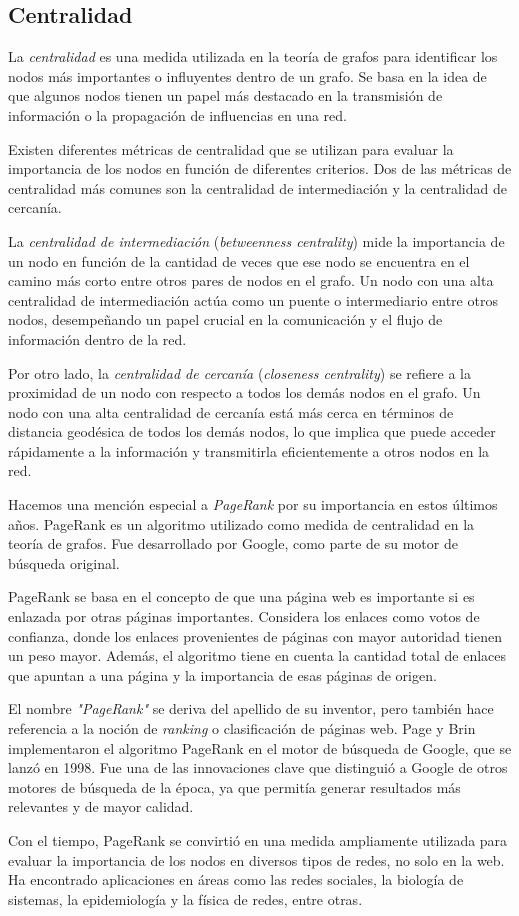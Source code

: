 \subsection{Centralidad}

La \textit{centralidad} es una medida utilizada en la teoría de grafos para identificar los nodos
más importantes o influyentes dentro de un grafo. Se basa en la idea de que algunos nodos tienen un
papel más destacado en la transmisión de información o la propagación de influencias en una red.

Existen diferentes métricas de centralidad que se utilizan para evaluar la importancia de los
nodos en función de diferentes criterios. Dos de las métricas de centralidad más comunes son la
centralidad de intermediación y la centralidad de cercanía.

La \textit{centralidad de intermediación} (\textit{betweenness centrality}) mide la importancia de
un nodo en función de la cantidad de veces que ese nodo se encuentra en el camino más corto entre
otros pares de nodos en el grafo. Un nodo con una alta centralidad de intermediación actúa como un
puente o intermediario entre otros nodos, desempeñando un papel crucial en la comunicación y el
flujo de información dentro de la red.

Por otro lado, la \textit{centralidad de cercanía} (\textit{closeness centrality}) se refiere a la
proximidad de un nodo con respecto a todos los demás nodos en el grafo. Un nodo con una alta
centralidad de cercanía está más cerca en términos de distancia geodésica de todos los demás nodos,
lo que implica que puede acceder rápidamente a la información y transmitirla eficientemente a otros
nodos en la red.

Hacemos una mención especial a \textit{PageRank} por su importancia en estos últimos años. PageRank es un algoritmo utilizado como medida de
centralidad en la teoría de grafos. Fue desarrollado por Google, como parte de su motor de búsqueda
original.

PageRank se basa en el concepto de que una página web es importante si es enlazada por otras
páginas importantes. Considera los enlaces como votos de confianza, donde los enlaces provenientes
de páginas con mayor autoridad tienen un peso mayor. Además, el algoritmo tiene en cuenta la
cantidad total de enlaces que apuntan a una página y la importancia de esas páginas de origen.

El nombre \textit{"PageRank"} se deriva del apellido de su inventor, pero también hace referencia
a la noción de \textit{ranking} o clasificación de páginas web. Page y Brin implementaron el
algoritmo PageRank en el motor de búsqueda de Google, que se lanzó en 1998. Fue una de
las innovaciones clave que distinguió a Google de otros motores de búsqueda de la época, ya que
permitía generar resultados más relevantes y de mayor calidad\cite{Pageetal98}.

Con el tiempo, PageRank se convirtió en una medida ampliamente utilizada para evaluar la importancia
de los nodos en diversos tipos de redes, no solo en la web. Ha encontrado aplicaciones en áreas como
las redes sociales, la biología de sistemas, la epidemiología y la física de redes, entre otras.

